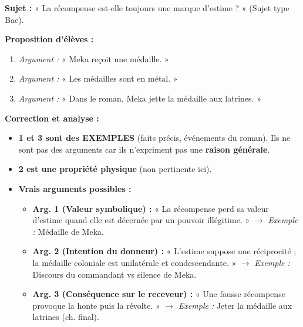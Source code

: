 \documentclass[11pt]{article}
\begin{document}
\begin{exoresolu}
\textbf{Sujet :} « La récompense est-elle toujours une marque d'estime ? » (Sujet type Bac).

\textbf{Proposition d'élèves :}
\begin{enumerate}
    \item \textit{Argument :} « Meka reçoit une médaille. »
    \item \textit{Argument :} « Les médailles sont en métal. »
    \item \textit{Argument :} « Dans le roman, Meka jette la médaille aux latrines. »
\end{enumerate}

\textbf{Correction et analyse :}
\begin{itemize}
    \item \textbf{1 et 3 sont des EXEMPLES} (faits précis, événements du roman). Ils ne sont pas des arguments car ils n'expriment pas une \textbf{raison générale}.
    \item \textbf{2 est une propriété physique} (non pertinente ici).
    \item \textbf{Vrais arguments possibles :}
    \begin{itemize}
        \item \textbf{Arg. 1 (Valeur symbolique) :} « La récompense perd sa valeur d'estime quand elle est décernée par un pouvoir illégitime. » $\rightarrow$ \emph{Exemple :} Médaille de Meka.
        \item \textbf{Arg. 2 (Intention du donneur) :} « L'estime suppose une réciprocité ; la médaille coloniale est unilatérale et condescendante. » $\rightarrow$ \emph{Exemple :} Discours du commandant vs silence de Meka.
        \item \textbf{Arg. 3 (Conséquence sur le receveur) :} « Une fausse récompense provoque la honte puis la révolte. » $\rightarrow$ \emph{Exemple :} Jeter la médaille aux latrines (ch. final).
    \end{itemize}
\end{itemize}
\end{exoresolu}
\end{document}
